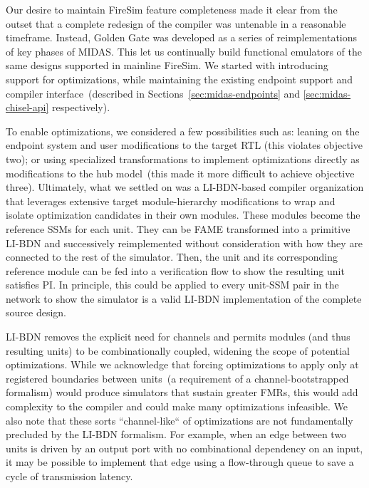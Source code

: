 Our desire to maintain FireSim feature completeness made it clear from the
outset that a complete redesign of the compiler was untenable in a reasonable timeframe. Instead, Golden
Gate was developed as a series of reimplementations of key phases of
MIDAS. This let us continually build functional emulators of the same designs
supported in mainline FireSim. We started with introducing support for
optimizations, while maintaining the existing endpoint support and compiler
interface~(described in Sections~\ref{sec:midas-endpoints} and \ref{sec:midas-chisel-api}
respectively).

To enable optimizations, we considered a few possibilities such as: leaning on
the endpoint system and user modifications to the target RTL (this violates
objective two); or using specialized transformations to implement optimizations
directly as modifications to the hub model~(this made it more difficult to
achieve objective three).  Ultimately, what we settled on was a LI-BDN-based compiler organization that leverages extensive target module-hierarchy modifications to
wrap and isolate optimization candidates in their own modules. These modules become the reference SSMs for each unit. They can be FAME
transformed into a primitive LI-BDN and successively reimplemented without consideration with how they are connected
to the rest of the simulator. Then, the unit and its corresponding reference module can be fed into a
verification flow to show the resulting unit satisfies PI. In principle, this could be applied to every unit-SSM pair in the network to
show the simulator is a valid LI-BDN implementation of the complete source design.

LI-BDN removes the explicit need for channels and permits modules (and thus resulting units) to be
combinationally coupled, widening the scope of potential optimizations. While we
acknowledge that forcing optimizations to apply only at registered boundaries
between units~(a requirement of a channel-bootstrapped formalism) would
produce simulators that sustain greater FMRs, this would add complexity to the
compiler and could make many optimizations infeasible. We also note that these
sorts ``channel-like`` of optimizations are not fundamentally precluded by the LI-BDN formalism. For example, when an edge
between two units is driven by an output port with no combinational dependency on
an input, it may be possible to implement that edge using a flow-through queue to save a
cycle of transmission latency.

